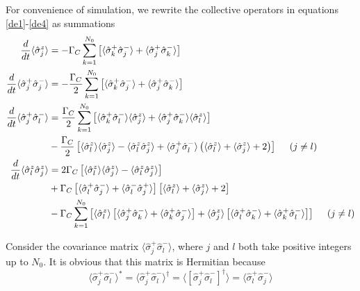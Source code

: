 \documentclass{article}
\newcommand{\gc}{\Gamma_C}
\begin{document}
For convenience of simulation, we rewrite the collective operators in equations \ref{de1}-\ref{de4} as summations
\begin{align}
\label{de1.1}
\frac{d}{dt}\langle\hat{\sigma}^z_j\rangle&=-\gc\sum_{k=1}^{N_0}\left[\langle\hat{\sigma}_k^+\hat{\sigma}^-_j\rangle+\langle\hat{\sigma}_j^+\hat{\sigma}_k^-\rangle\right]\\
\frac{d}{dt}\langle\hat{\sigma}^+_j\hat{\sigma}^-_j\rangle&=-\frac{\gc}{2}\sum_{k=1}^{N_0}\left[\langle\hat{\sigma}_k^+\hat{\sigma}^-_j\rangle+\langle\hat{\sigma}_j^+\hat{\sigma}_k^-\rangle\right]\\\notag
\frac{d}{dt}\langle\hat{\sigma}^+_j\hat{\sigma}^-_l\rangle&=\frac{\gc}{2}\sum_{k=1}^{N_0}\left[\langle\hat{\sigma}_k^+\hat{\sigma}_l^-\rangle \langle \hat{\sigma}_j^z\rangle+\langle\hat{\sigma}^+_j\hat{\sigma}_k^-\rangle \langle \hat{\sigma}_l^z\rangle\right]\\
&-\frac{\gc}{2}\left[\langle\hat{\sigma}_l^z\rangle \langle \hat{\sigma}_j^z\rangle-\langle\hat{\sigma}_l^z \hat{\sigma}_j^z\rangle
+\langle\hat{\sigma}_j^+ \hat{\sigma}_l^-\rangle\left(\langle\hat{\sigma}_l^z\rangle +\langle \hat{\sigma}_j^z\rangle+2\right)\right]\ \ \ \ (j\neq l)\\\notag
\frac{d}{dt}\langle\hat{\sigma}_l^z \hat{\sigma}_j^z\rangle&=2\gc\left[\langle\hat{\sigma}_l^z\rangle \langle \hat{\sigma}_j^z\rangle-\langle\hat{\sigma}_l^z \hat{\sigma}_j^z\rangle\right]\\\notag
&+\gc\left[\langle\hat{\sigma}_l^+\hat{\sigma}_j^-\rangle+\langle\hat{\sigma}_l^-\hat{\sigma}_j^+\rangle\right]\left[\langle\hat{\sigma}_l^z\rangle+\langle \hat{\sigma}_j^z\rangle+2\right]\\
\label{de4.1}
&-\gc\sum_{k=1}^{N_0}\left[\langle\hat{\sigma}_l^z\rangle\left[\langle\hat{\sigma}_j^+\hat{\sigma}_k^-\rangle+\langle\hat{\sigma}_k^+\hat{\sigma}_j^-\rangle\right]+\langle\hat{\sigma}_j^z\rangle\left[\langle\hat{\sigma}_l^+\hat{\sigma}_k^-\rangle+\langle\hat{\sigma}_k^+\hat{\sigma}_l^-\rangle\right]\right]\ \ \ \ (j\neq l)
\end{align}

Consider the covariance matrix $\langle\hat{\sigma}^+_j\hat{\sigma}^-_l\rangle$, where $j$ and $l$ both take positive integers up to $N_0$. It is obvious that this matrix is Hermitian because
\begin{equation}
    \langle\hat{\sigma}^+_j\hat{\sigma}^-_l\rangle^\ast = \langle\hat{\sigma}^+_j\hat{\sigma}^-_l\rangle^\dagger =\langle\left[\hat{\sigma}^+_j\hat{\sigma}^-_l\right]^\dagger\rangle=\langle\hat{\sigma}^+_l\hat{\sigma}^-_j\rangle
\end{equation}
\end{document}
